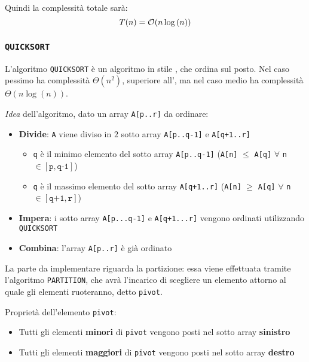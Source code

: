 \documentclass[italian, 10pt]{article}
\begin{document}
Quindi la complessità totale sarà:
\[ T(n) = \mathcal{O} (n \log{(n)}) \]

\subsubsection{\texttt{QUICKSORT}}

L'algoritmo \texttt{QUICKSORT} è un algoritmo in stile \textit{}, che ordina sul posto.
Nel caso pessimo ha complessità \(\Theta(n^2)\), superiore all', ma nel caso medio ha complessità \(\Theta\left(n \log{(n)}\right)\).

\textit{Idea} dell'algoritmo, dato un array \texttt{A[p..r]} da ordinare:

\begin{itemize}
  \item \textbf{Divide}: \texttt{A} viene diviso in \(2\) sotto array \texttt{A[p..q-1]} e \texttt{A[q+1..r]}
        \begin{itemize}
          \item \texttt{q} è il minimo elemento del sotto array \texttt{A[p..q-1]} (\texttt{A[n]} \(\leq\) \texttt{A[q]} \(\forall\) \texttt{n} \(\in [\texttt{p}, \texttt{q-1}]\))
          \item \texttt{q} è il massimo elemento del sotto array \texttt{A[q+1..r]} (\texttt{A[n]} \(\geq\) \texttt{A[q]} \(\forall\) \texttt{n} \(\in [\texttt{q+1}, \texttt{r}]\))
        \end{itemize}
  \item \textbf{Impera}: i sotto array \texttt{A[p...q-1]} e \texttt{A[q+1...r]} vengono ordinati utilizzando \texttt{QUICKSORT}
  \item \textbf{Combina}: l'array \texttt{A[p..r]} è già ordinato
\end{itemize}

La parte  da implementare riguarda la partizione: essa viene effettuata tramite l'algoritmo \texttt{PARTITION}, che avrà l'incarico di scegliere un elemento attorno al quale gli elementi ruoteranno, detto \texttt{pivot}.

Proprietà dell'elemento \texttt{pivot}:

\begin{itemize}
  \item Tutti gli elementi \textbf{minori} di \texttt{pivot} vengono posti nel sotto array \textbf{sinistro}
  \item Tutti gli elementi \textbf{maggiori} di \texttt{pivot} vengono posti nel sotto array \textbf{destro}
\end{itemize}
\end{document}
